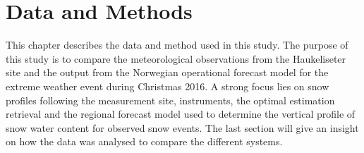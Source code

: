 \chapter{Data and Methods}\label{ch:Methods}

This chapter describes the data and method used in this study. 
The purpose of this study is to compare the meteorological observations from the Haukeliseter site and the output from the Norwegian operational forecast model %
for the extreme weather event during Christmas 2016. 
A strong focus lies on snow profiles following the measurement site, instruments, the optimal estimation retrieval and the regional forecast model used to determine the vertical profile of snow water content for observed snow events. 
The last section will give an insight on how the data was analysed to compare the different systems. 





